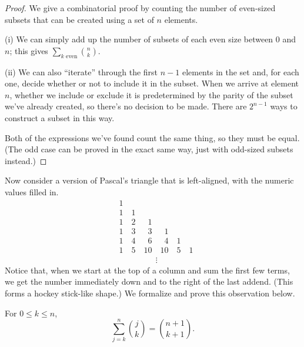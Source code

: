 \documentclass[../m055main.tex]{subfiles}
\begin{document}
\begin{proof}
    We give a combinatorial proof by counting the number of even-sized subsets that can be created using a set of $n$ elements.
    \smallskip

    (i) We can simply add up the number of subsets of each even size between 0 and $n$; this gives $\sum\limits_{k\text{ even}} {n \choose k}$.
    \smallskip

    (ii) We can also ``iterate'' through the first $n-1$ elements in the set and, for each one, decide whether or not to include it in the subset.
    When we arrive at element $n$, whether we include or exclude it is predetermined by the parity of the subset we've already created, so there's no decision to be made.
    There are $2^{n-1}$ ways to construct a subset in this way.
    \smallskip

    Both of the expressions we've found count the same thing, so they must be equal.
    (The odd case can be proved in the exact same way, just with odd-sized subsets instead.)
\end{proof}

Now consider a version of Pascal's triangle that is left-aligned, with the numeric values filled in.
\begin{align*}
    & 1 \quad \\
    & 1 \quad 1 \\
    & 1 \quad 2 \quad \phantom{1}1 \\
    & 1 \quad 3 \quad \phantom{1}3 \quad \phantom{1}1 \\
    & 1 \quad 4 \quad \phantom{1}6 \quad \phantom{1}4 \quad 1 \\
    & 1 \quad 5 \quad 10 \quad 10 \quad 5 \quad 1 \\
    & \phantom{1 \quad 5 \quad 10 \;\,} \vdots
\end{align*}
Notice that, when we start at the top of a column and sum the first few terms, we get the number immediately down and to the right of the last addend.
(This forms a hockey stick-like shape.)
We formalize and prove this observation below.

\pagebreak

\begin{theorem}
    For $0 \leq k \leq n$,
    \[ \sum_{j=k}^{n} {j \choose k} = {n+1 \choose k+1}. \]
\end{theorem}
\end{document}
